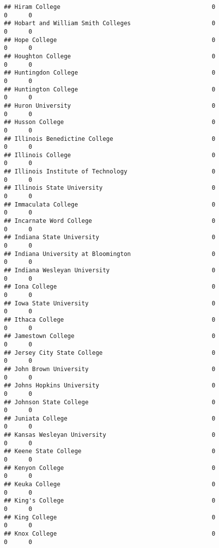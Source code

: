 \documentclass[
]{article}
\begin{document}
\begin{verbatim}
## Hiram College                                           0          0      0
## Hobart and William Smith Colleges                       0          0      0
## Hope College                                            0          0      0
## Houghton College                                        0          0      0
## Huntingdon College                                      0          0      0
## Huntington College                                      0          0      0
## Huron University                                        0          0      0
## Husson College                                          0          0      0
## Illinois Benedictine College                            0          0      0
## Illinois College                                        0          0      0
## Illinois Institute of Technology                        0          0      0
## Illinois State University                               0          0      0
## Immaculata College                                      0          0      0
## Incarnate Word College                                  0          0      0
## Indiana State University                                0          0      0
## Indiana University at Bloomington                       0          0      0
## Indiana Wesleyan University                             0          0      0
## Iona College                                            0          0      0
## Iowa State University                                   0          0      0
## Ithaca College                                          0          0      0
## Jamestown College                                       0          0      0
## Jersey City State College                               0          0      0
## John Brown University                                   0          0      0
## Johns Hopkins University                                0          0      0
## Johnson State College                                   0          0      0
## Juniata College                                         0          0      0
## Kansas Wesleyan University                              0          0      0
## Keene State College                                     0          0      0
## Kenyon College                                          0          0      0
## Keuka College                                           0          0      0
## King's College                                          0          0      0
## King College                                            0          0      0
## Knox College                                            0          0      0

\end{verbatim}
\end{document}
